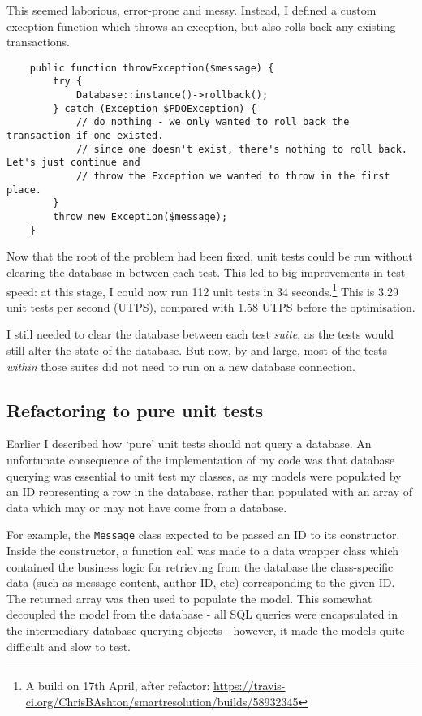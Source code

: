 This seemed laborious, error-prone and messy. Instead, I defined a custom exception function which throws an exception, but also rolls back any existing transactions.

\begin{minipage}{\textwidth}
\begin{lstlisting}
    public function throwException($message) {
        try {
            Database::instance()->rollback();
        } catch (Exception $PDOException) {
            // do nothing - we only wanted to roll back the transaction if one existed.
            // since one doesn't exist, there's nothing to roll back. Let's just continue and
            // throw the Exception we wanted to throw in the first place.
        }
        throw new Exception($message);
    }
\end{lstlisting}
\end{minipage}

Now that the root of the problem had been fixed, unit tests could be run without clearing the database in between each test. This led to big improvements in test speed: at this stage, I could now run 112 unit tests in 34 seconds.\footnote{A build on 17th April, after refactor: \url{https://travis-ci.org/ChrisBAshton/smartresolution/builds/58932345}} This is 3.29 unit tests per second (UTPS), compared with 1.58 UTPS before the optimisation.

I still needed to clear the database between each test \emph{suite}, as the tests would still alter the state of the database. But now, by and large, most of the tests \emph{within} those suites did not need to run on a new database connection.

\subsection{Refactoring to pure unit tests}

Earlier I described how `pure' unit tests should not query a database. An unfortunate consequence of the implementation of my code was that database querying was essential to unit test my classes, as my models were populated by an ID representing a row in the database, rather than populated with an array of data which may or may not have come from a database.

For example, the \lstinline{Message} class expected to be passed an ID to its constructor. Inside the constructor, a function call was made to a data wrapper class which contained the business logic for retrieving from the database the class-specific data (such as message content, author ID, etc) corresponding to the given ID. The returned array was then used to populate the model. This somewhat decoupled the model from the database - all SQL queries were encapsulated in the intermediary database querying objects - however, it made the models quite difficult and slow to test.

